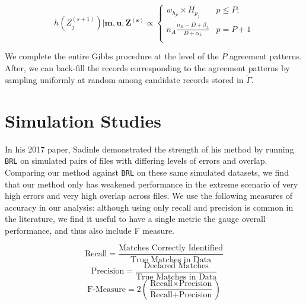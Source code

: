 \documentclass[
  12pt,
]{article}
\begin{document}
\[h\left(Z_j^{(s+1)}\right) | \mathbf{m}, \mathbf{u}, \mathbf{Z^{(s)}} \propto
\begin{cases} 
    w_{h_p}\times H_{p_j}  & p \leq P; \\
     n_A \frac{n_B - D + \beta_{\lambda}}{D + \alpha_{\lambda}} &   p = P + 1 \\
\end{cases}\]

We complete the entire Gibbs procedure at the level of the \(P\)
agreement patterns. After, we can back-fill the records corresponding to
the agreement patterns by sampling uniformly at random among candidate
records stored in \(\tilde{\Gamma}\).

\hypertarget{simulation-studies}{%
\section{Simulation Studies}\label{simulation-studies}}

In his 2017 paper, Sadinle demonstrated the strength of his method by
running \texttt{BRL} on simulated pairs of files with differing levels
of errors and overlap. Comparing our method against \texttt{BRL} on
these same simulated datasets, we find that our method only has weakened
performance in the extreme scenario of very high errors and very high
overlap across files. We use the following measures of accuracy in our
analysis: although using only recall and precision is common in the
literature, we find it useful to have a single metric the gauge overall
performance, and thus also include F measure.

\[\text{Recall} = \frac{\text{Matches Correctly Identified}}{\text{True Matches in Data}}\]
\[\text{Precision} = \frac{\text{Declared Matches}}{\text{True Matches in Data}}\]
\[\text{F-Measure} = 2\left(\frac{\text{Recall} \times \text{Precision}}{\text{Recall} + \text{Precision}}\right)\]
\end{document}
